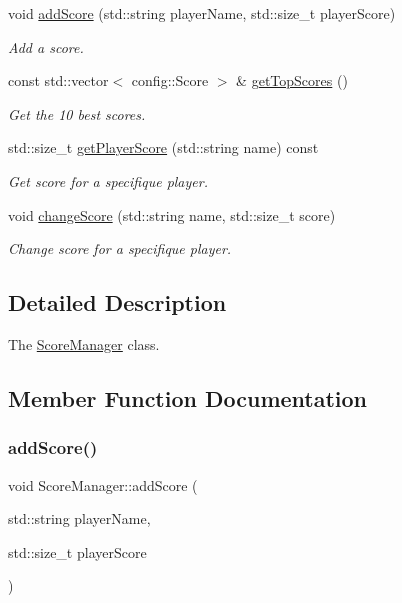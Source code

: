 \begin{DoxyCompactItemize}
void \hyperlink{classScoreManager_a9fba97d65a88e67a2d219d2ba36af111}{add\+Score} (std\+::string player\+Name, std\+::size\+\_\+t player\+Score)
\begin{DoxyCompactList}\small\item\em Add a score. \end{DoxyCompactList}\item 
\mbox{\label{classScoreManager_ad0c38dd0a27a82230d09f29ce3d12349}} 
const std\+::vector$<$ config\+::\+Score $>$ \& \hyperlink{classScoreManager_ad0c38dd0a27a82230d09f29ce3d12349}{get\+Top\+Scores} ()
\begin{DoxyCompactList}\small\item\em Get the 10 best scores. \end{DoxyCompactList}\item 
std\+::size\+\_\+t \hyperlink{classScoreManager_abc6c1d76fdcc17f1b8ebe4c7bf5550e2}{get\+Player\+Score} (std\+::string name) const
\begin{DoxyCompactList}\small\item\em Get score for a specifique player. \end{DoxyCompactList}\item 
void \hyperlink{classScoreManager_a01a80dda216fa5b83b58bca8de49114e}{change\+Score} (std\+::string name, std\+::size\+\_\+t score)
\begin{DoxyCompactList}\small\item\em Change score for a specifique player. \end{DoxyCompactList}\end{DoxyCompactItemize}


\subsection{Detailed Description}
The \hyperlink{classScoreManager}{Score\+Manager} class. 

\subsection{Member Function Documentation}
\mbox{\label{classScoreManager_a9fba97d65a88e67a2d219d2ba36af111}} 
\subsubsection{\texorpdfstring{add\+Score()}{addScore()}}
{\footnotesize\ttfamily void Score\+Manager\+::add\+Score (\begin{DoxyParamCaption}\item[{std\+::string}]{player\+Name,  }\item[{std\+::size\+\_\+t}]{player\+Score }\end{DoxyParamCaption})}



